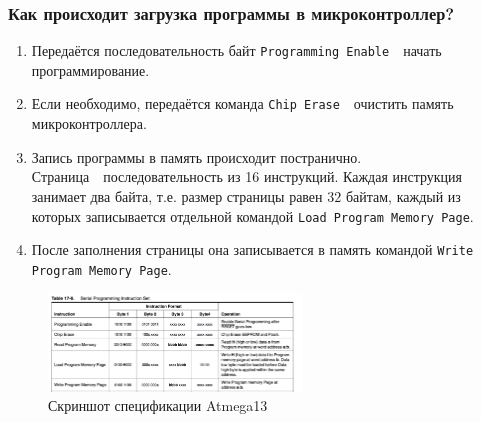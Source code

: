 \documentclass[aspectratio=169, pdf, 8pt, unicode]{beamer}
\begin{document}
\begin{frame}[fragile]
\frametitle{Как происходит загрузка программы в микроконтроллер?}
	{ \large
	\begin{enumerate}
		\item Передаётся последовательность байт \texttt{Programming Enable}\ \cyrdash\ начать программирование.
		\item Если необходимо, передаётся команда \texttt{Chip Erase}\ \cyrdash\ очистить память микроконтроллера.
		\item Запись программы в память происходит постранично. Страница\ \cyrdash\ последовательность из 16 инструкций.
		      Каждая инструкция занимает два байта, т.е. размер страницы равен $32$ байтам, каждый из которых записывается
		      отдельной командой \texttt{Load Program Memory Page}.
		\item После заполнения страницы она записывается в память командой \texttt{Write Program Memory Page}.
	\end{enumerate}
	}
	\begin{figure}[H]
	      \centering
	      \includegraphics[width=0.6\textwidth]{resources/programming_instruction_set.png}
	      \caption{Скриншот спецификации Atmega13}
	\end{figure}
\end{frame}
\end{document}
